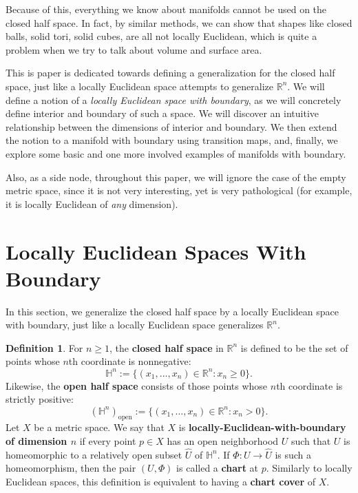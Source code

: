 \documentclass{article}
\newcommand{\R}{\mathbb{R}}
\renewcommand{\H}{\mathbb{H}}
\theoremstyle{plain} %
\numberwithin{thm}{section} %
\theoremstyle{definition} %
\newtheorem{defn}[thm]{Definition}
\begin{document}
Because of this, everything we know about manifolds cannot be used on the closed half space. In fact, by similar methods, we can show that shapes like closed balls, solid tori, solid cubes, are all not locally Euclidean, which is quite a problem when we try to talk about volume and surface area.

This is paper is dedicated towards defining a generalization for the closed half space, just like a locally Euclidean space attempts to generalize $\R^n$. We will define a notion of a \textit{locally Euclidean space with boundary}, as we will concretely define interior and boundary of such a space. We will discover an intuitive relationship between the dimensions of interior and boundary. We then extend the notion to a manifold with boundary using transition maps, and, finally, we explore some basic and one more involved examples of manifolds with boundary.

Also, as a side node, throughout this paper, we will ignore the case of the empty metric space, since it is not very interesting, yet is very pathological (for example, it is locally Euclidean of \textit{any} dimension).

\section{Locally Euclidean Spaces With Boundary}

In this section, we generalize the closed half space by a locally Euclidean space with boundary, just like a locally Euclidean space generalizes $\R^n$.

\begin{defn}
    For $n\geq 1$, the \textbf{closed half space} in $\R^n$ is defined to be the set of points whose $n$th coordinate is nonnegative:
        \[ \H^n := \{(x_1,\ldots,x_n) \in \R^n : x_n\geq 0\}. \]
    Likewise, the \textbf{open half space} consists of those points whose $n$th coordinate is strictly positive:
        \[ (\H^n)_{\mathrm{open}} := \{(x_1,\ldots,x_n) \in \R^n : x_n> 0\}. \]
    Let $X$ be a metric space. We say that $X$ is \textbf{locally-Euclidean-with-boundary of dimension $n$} if every point $p\in X$ has an open neighborhood $U$ such that $U$ is homeomorphic to a relatively open subset $\widehat{U}$ of $\H^n$. If $\Phi:U\rightarrow \widehat{U}$ is such a homeomorphism, then the pair $(U,\Phi)$ is called a \textbf{chart} at $p$. Similarly to locally Euclidean spaces, this definition is equivalent to having a \textbf{chart cover} of $X$.
\end{defn}
\end{document}
